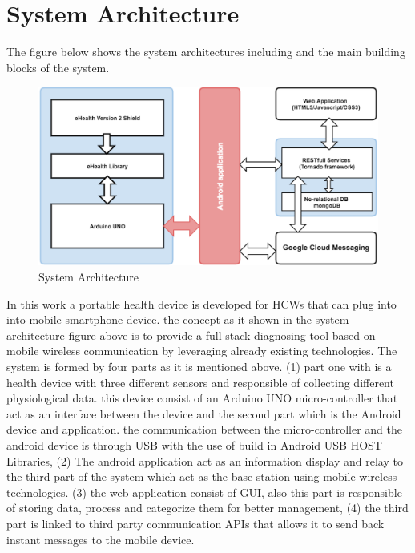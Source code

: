 \section{System Architecture}

The figure below shows the system architectures including and the main building blocks of the system.
\begin{figure}[H]
\centering
\includegraphics[width=15cm]{images/System_archutecture.png} %
\caption{System Architecture}
\label{fig:fig-eg}
\end{figure}

In this work a portable health device is developed for HCWs that can plug into into mobile smartphone device. the concept as it shown in the system architecture figure above is to provide a full stack diagnosing tool based on mobile wireless communication by leveraging already existing technologies. The system is formed by four parts as it is mentioned above. (1) part one with is a health device with three different sensors and responsible of collecting different physiological data. this device consist of an Arduino UNO micro-controller that act as an interface between the device and the second part which is the Android device and application. the communication between the micro-controller and the android device is through USB with the use of build in Android USB HOST Libraries, (2) The android application act as an information display and relay to the third part of the system which act as the base station using mobile wireless technologies. (3) the web application consist of GUI, also this part is responsible of storing data, process and categorize them for better management, (4) the third part is linked to third party communication APIs that allows it to send back instant messages to the mobile device.

